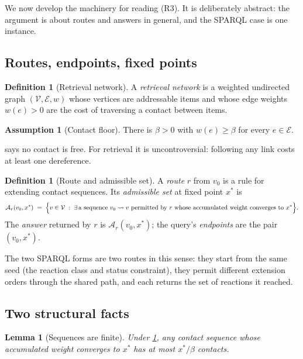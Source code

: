 \documentclass[11pt,a4paper]{article}
\theoremstyle{plain}
\newtheorem{lemma}[theorem]{Lemma}
\theoremstyle{definition}
\newtheorem{definition}[theorem]{Definition}
\newtheorem{assumption}[theorem]{Assumption}
\theoremstyle{remark}
\newcommand{\Adm}{\mathcal{A}}
\begin{document}
We now develop the machinery for reading (R3). It is deliberately abstract: the
argument is about routes and answers in general, and the SPARQL case is one
instance.

\subsection{Routes, endpoints, fixed points}

\begin{definition}[Retrieval network]
\label{def:network}
A \emph{retrieval network} is a weighted undirected graph
$(\mathcal{V},\mathcal{E},w)$ whose vertices are addressable items and whose
edge weights $w(e) > 0$ are the cost of traversing a contact between items.
\end{definition}

\begin{assumption}[Contact floor]
\label{ass:floor}
There is $\beta > 0$ with $w(e)\ge\beta$ for every $e\in\mathcal{E}$.
\end{assumption}

 says no contact is free. For retrieval it is uncontroversial:
following any link costs at least one dereference.

\begin{definition}[Route and admissible set]
\label{def:route}
A \emph{route} $r$ from $v_0$ is a rule for extending contact sequences. Its
\emph{admissible set} at fixed point $x^\ast$ is
\begin{equation}
\Adm_r(v_0, x^\ast) \;=\;
\Bigl\{ v \in \mathcal{V} \;:\;
\exists\, \text{a sequence } v_0 \rightsquigarrow v \text{ permitted by } r
\text{ whose accumulated weight converges to } x^\ast \Bigr\}.
\end{equation}
The \emph{answer} returned by $r$ is $\Adm_r(v_0,x^\ast)$; the query's
\emph{endpoints} are the pair $(v_0, x^\ast)$.
\end{definition}

The two SPARQL forms are two routes in this sense: they start from the same
seed (the reaction class and status constraint), they permit different
extension orders through the shared path, and each returns the set of reactions
it reached.

\subsection{Two structural facts}

\begin{lemma}[Sequences are finite]
\label{lem:finite}
Under \cref{ass:floor}, any contact sequence whose accumulated weight converges
to $x^\ast$ has at most $x^\ast/\beta$ contacts.
\end{lemma}
\end{document}
